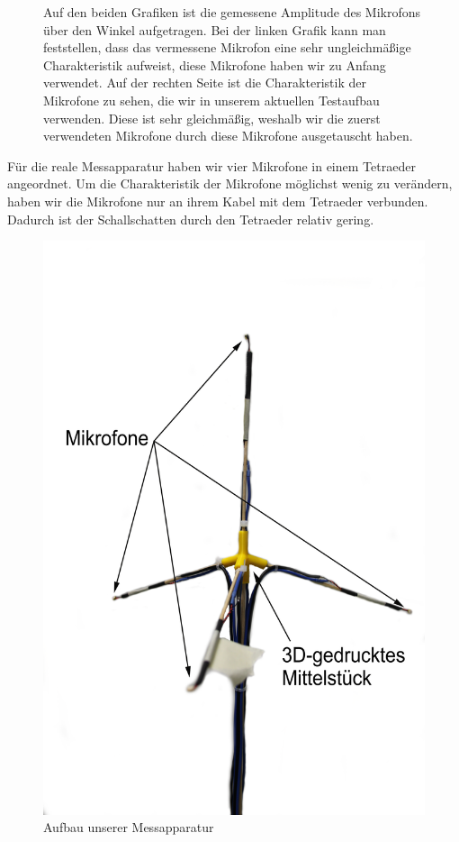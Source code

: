 \begin{figure}[H]
      \caption{Auf den beiden Grafiken ist die gemessene Amplitude des Mikrofons über den Winkel aufgetragen. Bei der linken Grafik kann man feststellen, dass das vermessene Mikrofon eine sehr ungleichmäßige Charakteristik aufweist, diese Mikrofone haben wir zu Anfang verwendet. Auf der rechten Seite ist die Charakteristik der Mikrofone zu sehen, die wir in unserem aktuellen Testaufbau verwenden. Diese ist sehr gleichmäßig, weshalb wir die zuerst verwendeten Mikrofone durch diese Mikrofone ausgetauscht haben.} 
      \label{fig:caracter}
  \end{figure}
  Für die reale Messapparatur haben wir vier Mikrofone in einem Tetraeder angeordnet. Um die Charakteristik der Mikrofone möglichst wenig zu verändern, haben wir die Mikrofone nur an ihrem Kabel mit dem Tetraeder verbunden. Dadurch ist der Schallschatten durch den Tetraeder relativ gering. 
  \begin{figure}
    \begin{center}
    \includegraphics[width=0.99\linewidth]{img/tet}
    \end{center}
    \caption{Aufbau unserer Messapparatur}
    \end{figure}
